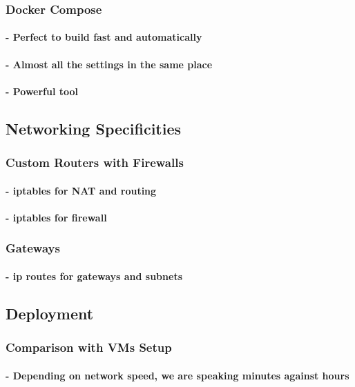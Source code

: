 \documentclass[a4paper,11pt,singlespacing]{article}
\begin{document}
        \subsubsection{Docker Compose}
            \paragraph{- Perfect to build fast and automatically}
            \paragraph{- Almost all the settings in the same place}
            \paragraph{- Powerful tool}
    \subsection{Networking Specificities}
        \subsubsection{Custom Routers with Firewalls}
            \paragraph{- iptables for NAT and routing}
            \paragraph{- iptables for firewall}
        \subsubsection{Gateways}
            \paragraph{- ip routes for gateways and subnets}
    \subsection{Deployment}
        \subsubsection{Comparison with VMs Setup}
            \paragraph{- Depending on network speed, we are speaking minutes against hours}
\end{document}
